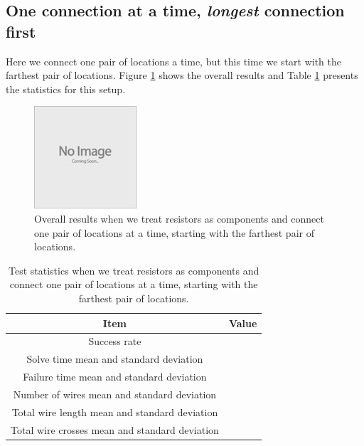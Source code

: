 \subsection{One connection at a time, \textit{longest} connection first}

Here we connect one pair of locations a time, but this time we start with the
farthest pair of locations. Figure \ref{fig:as_comp_pair_l} shows the overall
results and Table \ref{tb:as_comp_pair_l} presents the statistics for this
setup.

\begin{figure}[H]
\begin{center}
\includegraphics{Images/placeholder.jpg}
\caption{Overall results when we treat resistors as components and connect one
pair of locations at a time, starting with the farthest pair of locations.}
\label{fig:as_comp_pair_l}
\end{center}
\end{figure}

\begin{table}[H]
\begin{center}
\begin{singlespace}
\begin{tabular}{| c | c |}
\hline
Item & Value \\
\hline\hline
Success rate & \\
Solve time mean and standard deviation & \\
Failure time mean and standard deviation & \\
Number of wires mean and standard deviation & \\
Total wire length mean and standard deviation & \\
Total wire crosses mean and standard deviation & \\
\hline
\end{tabular}
\end{singlespace}
\end{center}
\label{tb:as_comp_pair_l}
\caption{Test statistics when we treat resistors as components and connect one
pair of locations at a time, starting with the farthest pair of locations.}
\end{table}

